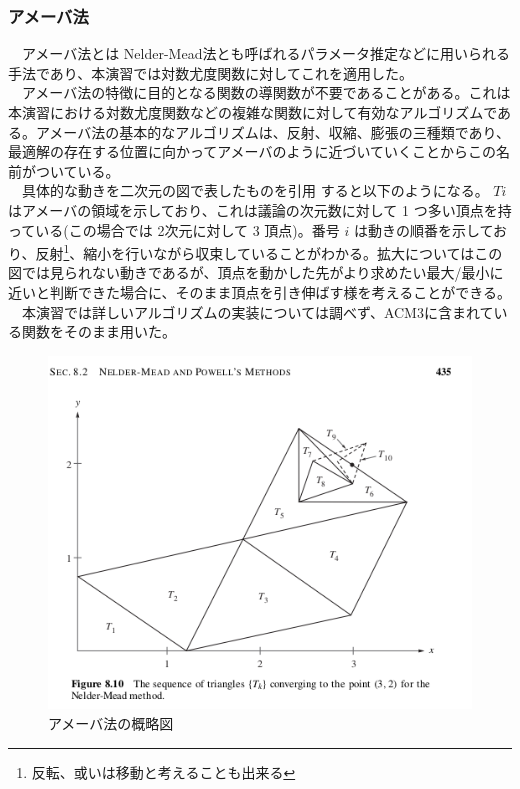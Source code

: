 \documentclass{scrartcl}
\begin{document}
\subsubsection{アメーバ法}
\label{sec:org1bfbcb1}
　アメーバ法とは Nelder-Mead法とも呼ばれるパラメータ推定などに用いられる手法であり、本演習では対数尤度関数に対してこれを適用した。\\
　アメーバ法の特徴に目的となる関数の導関数が不要であることがある。これは本演習における対数尤度関数などの複雑な関数に対して有効なアルゴリズムである。アメーバ法の基本的なアルゴリズムは、反射、収縮、膨張の三種類であり、最適解の存在する位置に向かってアメーバのように近づいていくことからこの名前がついている。\\
　具体的な動きを二次元の図で表したものを引用 \cite{nelder-mead} すると以下のようになる。 \(Ti\) はアメーバの領域を示しており、これは議論の次元数に対して 1 つ多い頂点を持っている(この場合では 2次元に対して 3 頂点)。番号 \(i\) は動きの順番を示しており、反射\footnote{反転、或いは移動と考えることも出来る}、縮小を行いながら収束していることがわかる。拡大についてはこの図では見られない動きであるが、頂点を動かした先がより求めたい最大/最小に近いと判断できた場合に、そのまま頂点を引き伸ばす様を考えることができる。\\
　本演習では詳しいアルゴリズムの実装については調べず、ACM3に含まれている関数をそのまま用いた。\\
\begin{figure}[htbp]
\centering
\includegraphics[width=15cm]{./nelder-mead.png}
\caption{アメーバ法の概略図}
\end{figure}
\end{document}
